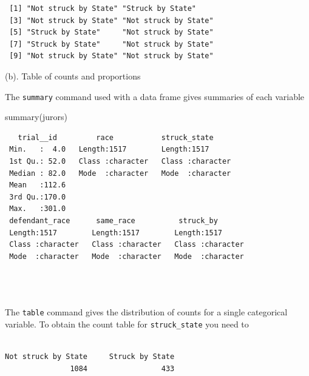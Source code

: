 \documentclass[
]{book}
\newenvironment{Shaded}{\begin{snugshade}}{\end{snugshade}}
\newcommand{\FunctionTok}[1]{\textcolor[rgb]{0.00,0.00,0.00}{#1}}
\newcommand{\NormalTok}[1]{#1}
\newcommand{\OtherTok}[1]{\textcolor[rgb]{0.56,0.35,0.01}{#1}}
\newcommand{\SpecialCharTok}[1]{\textcolor[rgb]{0.00,0.00,0.00}{#1}}
\begin{document}
\begin{verbatim}
 [1] "Not struck by State" "Struck by State"    
 [3] "Not struck by State" "Not struck by State"
 [5] "Struck by State"     "Not struck by State"
 [7] "Struck by State"     "Not struck by State"
 [9] "Not struck by State" "Not struck by State"
\end{verbatim}

(b). Table of counts and proportions

The \texttt{summary} command used with a data frame gives summaries of each variable

\begin{Shaded}
\begin{Highlighting}[]
\FunctionTok{summary}\NormalTok{(jurors)}
\end{Highlighting}
\end{Shaded}

\begin{verbatim}
   trial__id         race           struck_state      
 Min.   :  4.0   Length:1517        Length:1517       
 1st Qu.: 52.0   Class :character   Class :character  
 Median : 82.0   Mode  :character   Mode  :character  
 Mean   :112.6                                        
 3rd Qu.:170.0                                        
 Max.   :301.0                                        
 defendant_race      same_race          struck_by        
 Length:1517        Length:1517        Length:1517       
 Class :character   Class :character   Class :character  
 Mode  :character   Mode  :character   Mode  :character  
                                                         
                                                         
                                                         
\end{verbatim}

The \texttt{table} command gives the distribution of counts for a single categorical variable. To obtain the count table for \texttt{struck\_state} you need to

\begin{Shaded}
\end{Shaded}

\begin{verbatim}

Not struck by State     Struck by State 
               1084                 433 
\end{verbatim}
\end{document}

